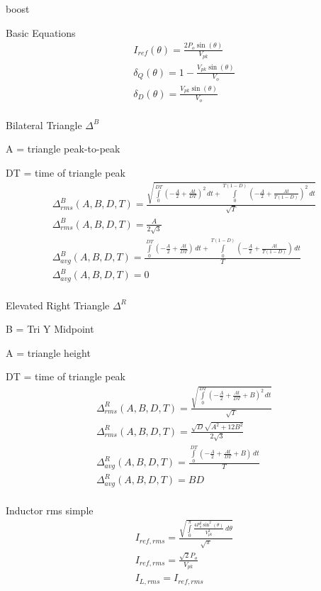 \documentclass[12pt]{report}
\begin{document}
boost


Basic Equations
\begin{align}
I_{ref}(\theta) = \frac{2 P_{o} \sin{\left(\theta \right)}}{V_{pk}}\\
\delta_{Q}(\theta) = 1 - \frac{V_{pk} \sin{\left(\theta \right)}}{V_{o}}\\
\delta_{D}(\theta) = \frac{V_{pk} \sin{\left(\theta \right)}}{V_{o}}\\
\end{align}

Bilateral Triangle $\Delta^B$ 

A = triangle peak-to-peak 

DT = time of triangle peak
\begin{align}
\Delta^B_{rms}(A,B,D,T) = \frac{\sqrt{\int\limits_{0}^{D T} \left(- \frac{A}{2} + \frac{A t}{D T}\right)^{2}\, dt + \int\limits_{0}^{T \left(1 - D\right)} \left(- \frac{A}{2} + \frac{A t}{T \left(1 - D\right)}\right)^{2}\, dt}}{\sqrt{T}}\\
\Delta^B_{rms}(A,B,D,T) = \frac{A}{2 \sqrt{3}}\\
\Delta^B_{avg}(A,B,D,T) = \frac{\int\limits_{0}^{D T} \left(- \frac{A}{2} + \frac{A t}{D T}\right)\, dt + \int\limits_{0}^{T \left(1 - D\right)} \left(- \frac{A}{2} + \frac{A t}{T \left(1 - D\right)}\right)\, dt}{T}\\
\Delta^B_{avg}(A,B,D,T) = 0\\
\end{align}

Elevated Right Triangle $\Delta^R$ 

B = Tri Y Midpoint 

A = triangle height 

DT = time of triangle peak
\begin{align}
\Delta^R_{rms}(A,B,D,T) = \frac{\sqrt{\int\limits_{0}^{D T} \left(- \frac{A}{2} + \frac{A t}{D T} + B\right)^{2}\, dt}}{\sqrt{T}}\\
\Delta^R_{rms}(A,B,D,T) = \frac{\sqrt{D} \sqrt{A^{2} + 12 B^{2}}}{2 \sqrt{3}}\\
\Delta^R_{avg}(A,B,D,T) = \frac{\int\limits_{0}^{D T} \left(- \frac{A}{2} + \frac{A t}{D T} + B\right)\, dt}{T}\\
\Delta^R_{avg}(A,B,D,T) = B D\\
\end{align}

Inductor rms simple
\begin{align}
I_{ref,rms} = \frac{\sqrt{\int\limits_{0}^{\pi} \frac{4 P_{o}^{2} \sin^{2}{\left(\theta \right)}}{V_{pk}^{2}}\, d\theta}}{\sqrt{\pi}}\\
I_{ref,rms} = \frac{\sqrt{2} P_{o}}{V_{pk}}\\
I_{L,rms} = I_{ref,rms}\\
\end{align}
\end{document}
